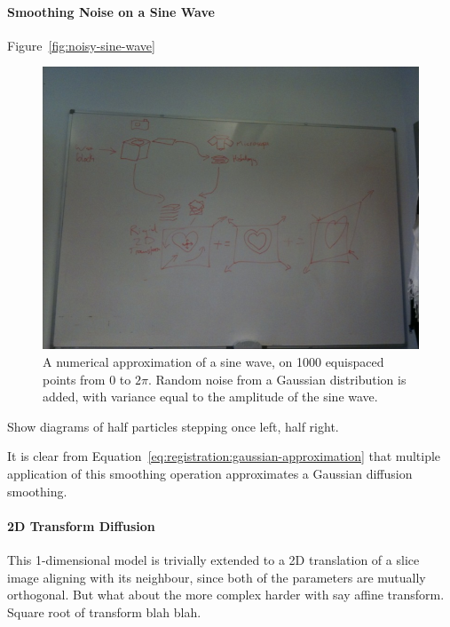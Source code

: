       \paragraph{Smoothing Noise on a Sine Wave}
        Figure~\ref{fig:noisy-sine-wave}
        \begin{figure}[htbp]
          \centering
          \includegraphics[height=0.7\textwidth]{Ch6/Figs/process_diagram}
          \caption{A numerical approximation of a sine wave, on 1000 equispaced points from $0$ to $2\pi$. Random noise from a Gaussian distribution is added, with variance equal to the amplitude of the sine wave.}
        \end{figure}
      
        
        Show diagrams of half particles stepping once left, half right.
        
        It is clear from Equation~\ref{eq:registration:gaussian-approximation} that multiple application of this smoothing operation approximates a Gaussian diffusion smoothing.

      \paragraph{2D Transform Diffusion}
        This 1-dimensional model is trivially extended to a 2D translation of a slice image aligning with its neighbour, since both of the parameters are mutually orthogonal. But what about the more complex harder with say affine transform. Square root of transform blah blah.


    
  
